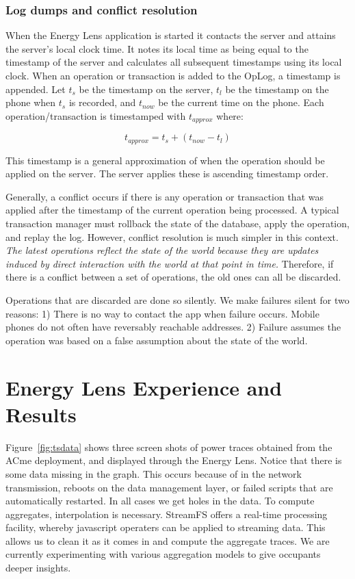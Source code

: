 \subsubsection{Log dumps and conflict resolution}
\label{sec:conflicts}
When the Energy Lens application is started it contacts the server and attains the server's local clock time. 
It notes its local time as being equal to the timestamp of the server and calculates all subsequent timestamps
using its local clock.  When an operation or transaction is added to the OpLog, a timestamp is appended.  Let $t_s$ be the timestamp 
on the server, $t_l$ be the timestamp on the phone when $t_s$ is recorded, and $t_{now}$ be the current time on the phone.  
Each operation/transaction is timestamped with $t_{approx}$ where:

\begin{equation}
t_{approx} = t_s + (t_{now} - t_l)
\end{equation}

This timestamp is a general approximation of when the operation should be applied on the server.  The server applies 
these is ascending timestamp order.

Generally, a conflict occurs if there is any operation or transaction that was applied after the timestamp of the current operation
being processed.  A typical transaction manager must rollback the state of the database, apply the operation, and replay
the log.  However, conflict resolution is much simpler in this context.  \emph{The latest operations reflect the state of the
world because they are updates induced by direct interaction with the world at that point in time.}  Therefore, if there is a conflict
between a set of operations, the old ones can all be discarded.

Operations that are discarded are done so silently.  We make failures silent for two reasons: 1) There is no way to contact the app when 
failure occurs.  Mobile phones
do not often have reversably reachable addresses.  2) Failure assumes the operation was based on a false assumption about the state
of the world.  


\section{Energy Lens Experience and Results}

Figure~\ref{fig:tsdata} shows three screen shots of power traces obtained from the ACme deployment, and displayed
through the Energy Lens.  Notice that there is
some data missing in the graph.  This occurs because of in the network transmission, reboots on the data management layer,
or failed scripts that are automatically restarted.  In all cases we get holes in the data.  To compute aggregates, interpolation 
is necessary.  StreamFS offers a real-time processing facility, whereby javascript operaters can be applied
to streaming data.  This allows us to clean it as it comes in and compute the aggregate traces.  We are currently experimenting
with various aggregation models to give occupants deeper insights.  


